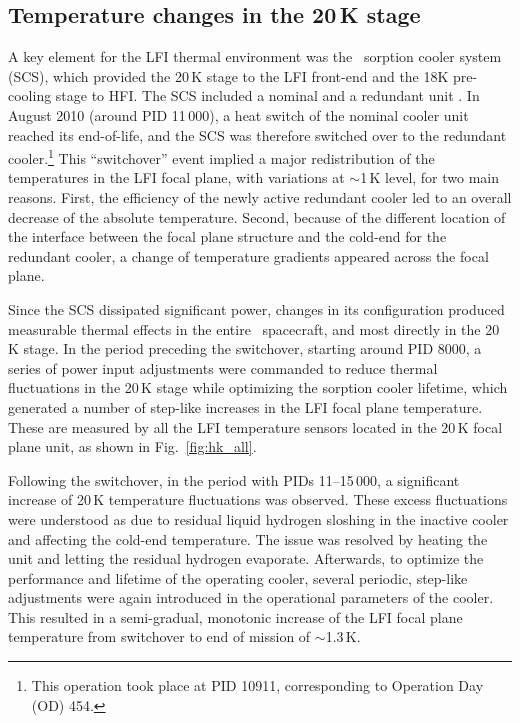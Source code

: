 \documentclass[twocolumn]{aa}
\begin{document}
\subsection{Temperature changes in the 20\,K stage}
A key element for the LFI thermal environment was the
\Planck\ sorption cooler system (SCS), which provided the 20\,K stage
to the LFI front-end and the 18K pre-cooling stage to HFI. The SCS
included a nominal and a redundant unit \citep{planck2011-1.3}. In
August 2010 (around PID 11\,000), a heat switch of the nominal cooler
unit reached its end-of-life, and the SCS was therefore switched over
to the redundant cooler.\footnote{This operation took place at PID
  10911, corresponding to Operation Day (OD) 454.}  This ``switchover''
event implied a major redistribution of the temperatures in the LFI
focal plane, with variations at $\sim$1\,K level, for two main
reasons. First, the efficiency of the newly active redundant cooler
led to an overall decrease of the absolute temperature. Second,
because of the different location of the interface between the focal
plane structure and the cold-end for the redundant cooler, a change of
temperature gradients appeared across the focal plane.

Since the SCS dissipated significant power, changes in its
configuration produced measurable thermal effects in the entire \Planck\
spacecraft, and most directly in the 20\,K stage. In the period
preceding the switchover, starting around PID 8000, a series of power
input adjustments were commanded to reduce thermal fluctuations in the
20\,K stage while optimizing the sorption cooler lifetime, which
generated a number of step-like increases in the LFI focal plane
temperature. These are measured by all the LFI temperature 
sensors located in the 20\,K focal plane unit, as shown in Fig.~\ref{fig:hk_all}.

Following the switchover, in the period with PIDs 11--15\,000, a
significant increase of 20\,K temperature fluctuations was
observed. These excess fluctuations were understood as due to residual
liquid hydrogen sloshing in the inactive cooler and affecting the
cold-end temperature. The issue was resolved by heating the unit and
letting the residual hydrogen evaporate. Afterwards, to optimize the
performance and lifetime of the operating cooler, several periodic,
step-like adjustments were again introduced in the operational
parameters of the cooler. This resulted in a semi-gradual, monotonic
increase of the LFI focal plane temperature from switchover to end of
mission of $\sim$1.3\,K.
\end{document}
